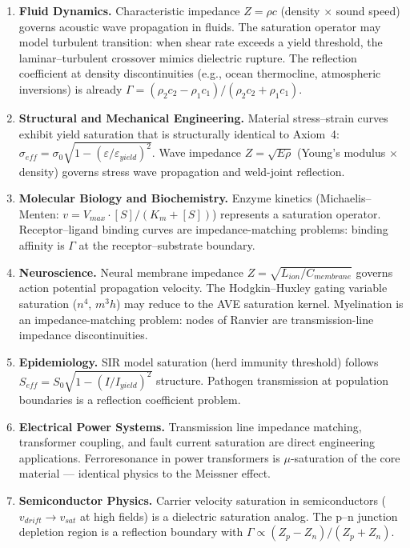 \begin{enumerate}

\item \textbf{Fluid Dynamics.}
Characteristic impedance $Z = \rho c$ (density $\times$ sound speed)
governs acoustic wave propagation in fluids.  The saturation operator
may model turbulent transition: when shear rate exceeds a yield
threshold, the laminar--turbulent crossover mimics dielectric
rupture.  The reflection coefficient at density discontinuities
(e.g., ocean thermocline, atmospheric inversions) is already
$\Gamma = (\rho_2 c_2 - \rho_1 c_1)/(\rho_2 c_2 + \rho_1 c_1)$.

\item \textbf{Structural and Mechanical Engineering.}
Material stress--strain curves exhibit yield saturation that is
structurally identical to Axiom~4: $\sigma_{eff} = \sigma_0
\sqrt{1 - (\varepsilon/\varepsilon_{yield})^2}$.  Wave impedance
$Z = \sqrt{E \rho}$ (Young's modulus $\times$ density) governs
stress wave propagation and weld-joint reflection.

\item \textbf{Molecular Biology and Biochemistry.}
Enzyme kinetics (Michaelis--Menten: $v = V_{max} \cdot [S]/(K_m +
[S])$) represents a saturation operator.  Receptor--ligand binding
curves are impedance-matching problems: binding affinity is $\Gamma$
at the receptor--substrate boundary.

\item \textbf{Neuroscience.}
Neural membrane impedance $Z = \sqrt{L_{ion}/C_{membrane}}$ governs
action potential propagation velocity.  The Hodgkin--Huxley gating
variable saturation ($n^4$, $m^3 h$) may reduce to the AVE saturation
kernel.  Myelination is an impedance-matching problem: nodes of
Ranvier are transmission-line impedance discontinuities.

\item \textbf{Epidemiology.}
SIR model saturation (herd immunity threshold) follows
$S_{eff} = S_0 \sqrt{1 - (I/I_{yield})^2}$ structure.  Pathogen
transmission at population boundaries is a reflection coefficient
problem.

\item \textbf{Electrical Power Systems.}
Transmission line impedance matching, transformer coupling, and
fault current saturation are direct engineering applications.
Ferroresonance in power transformers is $\mu$-saturation of the
core material --- identical physics to the Meissner effect.

\item \textbf{Semiconductor Physics.}
Carrier velocity saturation in semiconductors ($v_{drift} \to v_{sat}$
at high fields) is a dielectric saturation analog.  The p--n
junction depletion region is a reflection boundary with
$\Gamma \propto (Z_p - Z_n)/(Z_p + Z_n)$.


\end{enumerate}
